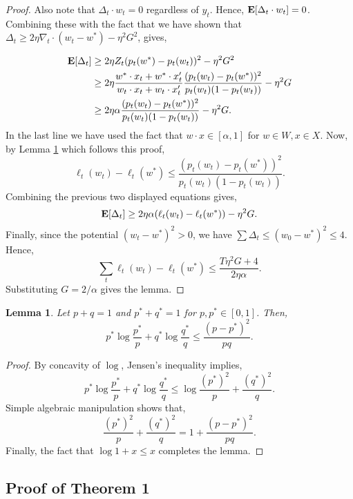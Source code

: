 \documentclass{article}
\newtheorem{lemma}{Lemma}
\begin{document}
\begin{proof}
Also note that $\Delta_t \cdot w_t =0$ regardless of $y_t$.  Hence,
${\bf E}[ \Delta_t \cdot w_t] =0$.  Combining these with the fact that we have shown that $\Delta_t \geq 2\eta \nabla_t \cdot(w_t-w^*)-\eta^2 G^2$, gives,

\begin{align*}
{\bf E}[\Delta_t] &\geq 2\eta Z_t (p_t(w^*)-p_t(w_t))^2-\eta^2G^2\\
&\geq 2 \eta \frac{w^*\cdot x_t + w^* \cdot x_t'}{w_t\cdot x_t + w_t \cdot x_t'}\frac{(p_t(w_t)-p_t(w^*))^2}{p_t(w_t)(1-p_t(w_t))}-\eta^2G\\
&\geq 2\eta\alpha \frac{(p_t(w_t)-p_t(w^*))^2}{p_t(w_t)(1-p_t(w_t))}-\eta^2G.
\end{align*}
In the last line we have used the fact that $w\cdot x \in [\alpha,1]$ for $w\in W,x\in X$.
Now, by Lemma \ref{lem:appx1} which follows this proof,
$$\ell_t(w_t)-\ell_t(w^*) \leq \frac{(p_t(w_t)-p_t(w^*))^2}{p_t(w_t)(1-p_t(w_t))}.$$
Combining the previous two displayed equations gives,
$${\bf E}[\Delta_t]  \geq 2 \eta\alpha (\ell_t(w_t)-\ell_t(w^*))-\eta^2G.$$
Finally, since the potential $(w_t -w^*)^2>0$, we have $\sum \Delta_t \leq (w_0-w^*)^2 \leq 4.$  Hence,
$$\sum_t \ell_t(w_t)-\ell_t(w^*) \leq \frac{T \eta^2 G+4}{2\eta \alpha}.$$
Substituting $G=2/\alpha$ gives the lemma.
\end{proof}



\begin{lemma}\label{lem:appx1}
Let $p+q=1$ and $p^*+q^*=1$ for $p,p^* \in [0,1]$.  Then,
$$p^* \log \frac{p^*}{p} + q^* \log \frac{q^*}{q} \leq \frac{(p-p^*)^2}{pq}.$$
\end{lemma}
\begin{proof}
By concavity of $\log$, Jensen's inequality implies,
$$p^* \log \frac{p^*}{p} + q^* \log \frac{q^*}{q}  \leq \log \frac{(p^*)^2}{p} + \frac{(q^*)^2}{q}.$$
Simple algebraic manipulation shows that,
$$\frac{(p^*)^2}{p} + \frac{(q^*)^2}{q} = 1 + \frac{(p-p^*)^2}{pq}.$$
Finally, the fact that $\log 1+x \leq x$ completes the lemma.
\end{proof}


\subsection{Proof of Theorem 1}
\end{document}
